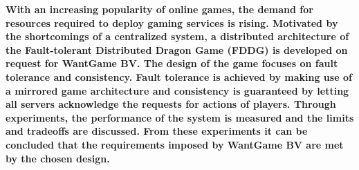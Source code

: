 \textbf{With an increasing popularity of online games, the demand for resources required to deploy gaming services is rising.
	Motivated by the shortcomings of a centralized system, a distributed architecture of the Fault-tolerant Distributed Dragon Game (FDDG) is developed on request for WantGame BV. 
	The design of the game focuses on fault tolerance and consistency.
	Fault tolerance is achieved by making use of a mirrored game architecture and consistency is guaranteed by letting all servers acknowledge the requests for actions of players. 
	Through experiments, the performance of the system is measured and the limits and tradeoffs are discussed.
	From these experiments it can be concluded that the requirements imposed by WantGame BV are met by the chosen design.}
